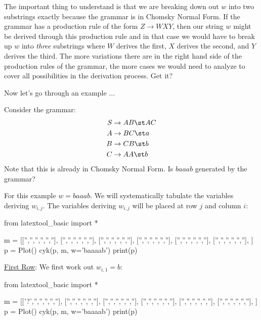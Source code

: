 The important thing to understand is that we are breaking down
out $w$ into two substrings exactly because the grammar is in
Chomsky Normal Form.
If the grammar has a production rule of the form
$Z \rightarrow WXY$, then our string $w$
might be derived through this production rule and in that case
we would have to break up $w$ into \textit{three} substrings
where $W$ derives the first, $X$ derives the second, and $Y$
derives the third.
The more variations there are in the right hand side of the
production rules of the grammar, the more cases
we would need to analyze to cover
all possibilities in the derivation process.
Get it?

Now let's go through an example ...


\newpage
\begin{eg}
Consider the grammar:
\begin{align*}
S &\rightarrow AB \st AC \\
A &\rightarrow BC \st a \\
B &\rightarrow CB \st b \\
C &\rightarrow AA \st b
\end{align*}
Note that this is already in Chomsky Normal Form.
Is $baaab$ generated by the grammar?
\end{eg}

\SOLUTION
For this example $w = baaab$.
We will systematically tabulate the variables deriving $w_{i,j}$.
The variables deriving $w_{i,j}$ will be placed at row $j$ and column $i$:
\begin{python}
from latextool_basic import *

m = [['','','','','',''],
     ['','','','','',''],
     ['','','','','',''],
     ['','','','','',''],
     ['','','','','',''],
     ['','','','','',''],
     ]
p = Plot()
cyk(p, m, w='baaaab')
print(p)
\end{python}


\underline{First Row}:
We first work out $w_{i,1} = b$:
\begin{python}
from latextool_basic import *

m = [['?','','','','',''],
     ['','','','','',''],
     ['','','','','',''],
     ['','','','','',''],
     ['','','','','',''],
     ['','','','','',''],
     ]
p = Plot()
cyk(p, m, w='baaaab')
print(p)
\end{python}


